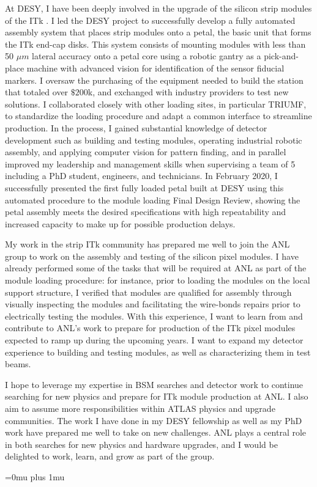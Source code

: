 \documentclass[a4paper]{article}
\begin{document}
At DESY, I have been deeply involved in the upgrade of the silicon strip modules of the ITk \cite{ITKstrips}.
I led the DESY project to successfully develop a fully automated assembly system that places strip modules onto a petal, the basic unit that forms the ITk end-cap disks.
This system consists of mounting modules with less than 50 $\mu m$ lateral accuracy onto a petal core using a robotic gantry as a pick-and-place machine with advanced vision for identification of the sensor fiducial markers. I oversaw the purchasing of the equipment needed to build the station that totaled over $\$200$k, and exchanged with industry providers to test new solutions. I collaborated closely with other loading sites, in particular TRIUMF, to standardize the loading procedure and adapt a common interface to streamline production.
In the process, I gained substantial knowledge of detector development such as building and testing modules, operating industrial robotic assembly, and applying computer vision for pattern finding, and in parallel improved my leadership and management skills when supervising a team of 5 including a PhD student, engineers, and technicians. In February 2020, I successfully presented the first fully loaded petal built at DESY using this automated procedure to the module loading Final Design Review, showing the petal assembly meets the desired specifications with high repeatability and increased capacity to make up for possible production delays.

My work in the strip ITk community has prepared me well to join the ANL group to work on the assembly and testing of the silicon pixel modules.
I have already performed some of the tasks that will be required at ANL as part of the module loading procedure: for instance, prior to loading the modules on the local support structure, I verified that modules are qualified for assembly through visually inspecting the modules and
facilitating the wire-bonds repairs prior to electrically testing the modules.
With this experience, I want to learn from and contribute to ANL's work to prepare for production of the ITk pixel modules expected to ramp up during the upcoming years. I want to expand my detector experience to building and testing modules, as well as characterizing them in test beams.



I hope to leverage my expertise in BSM searches and detector work to continue searching for new physics and prepare for ITk
module production at ANL. I also aim to assume more responsibilities within ATLAS physics and upgrade communities. The work I have done
in my DESY fellowship as well as my PhD work have prepared me well to take on new challenges.
ANL plays a central role in both searches for new physics and hardware upgrades, and I would be delighted to work,
learn, and grow as part of the group.




\Urlmuskip=0mu plus 1mu\relax
{%
\fontsize{11}{14}
\selectfont
}{}

\end{document}
